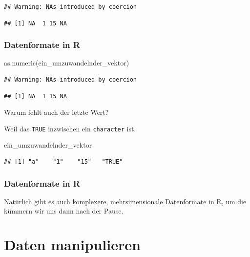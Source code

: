 \documentclass[
]{book}
\newenvironment{Shaded}{\begin{snugshade}}{\end{snugshade}}
\newcommand{\FunctionTok}[1]{\textcolor[rgb]{0.00,0.00,0.00}{#1}}
\newcommand{\NormalTok}[1]{#1}
\begin{document}
\begin{verbatim}
## Warning: NAs introduced by coercion
\end{verbatim}

\begin{verbatim}
## [1] NA  1 15 NA
\end{verbatim}

\hypertarget{datenformate-in-r-6}{%
\subsection{Datenformate in R}\label{datenformate-in-r-6}}

\begin{Shaded}
\begin{Highlighting}[]
\FunctionTok{as.numeric}\NormalTok{(ein\_umzuwandelnder\_vektor)}
\end{Highlighting}
\end{Shaded}

\begin{verbatim}
## Warning: NAs introduced by coercion
\end{verbatim}

\begin{verbatim}
## [1] NA  1 15 NA
\end{verbatim}

Warum fehlt auch der letzte Wert?

Weil das \texttt{TRUE} inzwischen ein \texttt{character} ist.

\begin{Shaded}
\begin{Highlighting}[]
\NormalTok{ein\_umzuwandelnder\_vektor}
\end{Highlighting}
\end{Shaded}

\begin{verbatim}
## [1] "a"    "1"    "15"   "TRUE"
\end{verbatim}

\hypertarget{datenformate-in-r-7}{%
\subsection{Datenformate in R}\label{datenformate-in-r-7}}

Natürlich gibt es auch komplexere, mehrsimensionale Datenformate in R, um die kümmern wir uns dann nach der Pause.

\hypertarget{daten-manipulieren}{%
\chapter{Daten manipulieren}\label{daten-manipulieren}}
\end{document}
